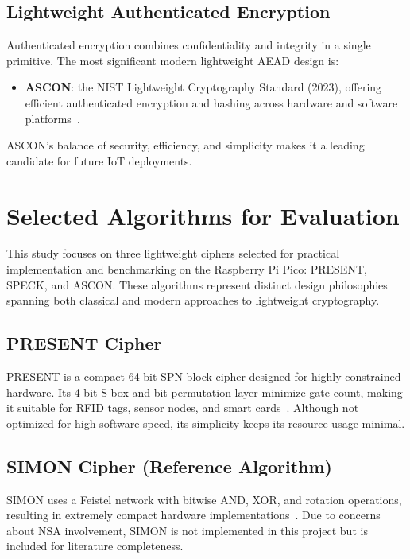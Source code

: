 \documentclass[12pt]{report}
\begin{document}
\subsection{Lightweight Authenticated Encryption}

Authenticated encryption combines confidentiality and integrity in a single primitive. The most significant modern lightweight AEAD design is:
\begin{itemize}
    \item \textbf{ASCON}: the NIST Lightweight Cryptography Standard (2023), offering efficient authenticated encryption and hashing across hardware and software platforms~\cite{dobraunig2016ascon,nist2023lwc}.
\end{itemize}

ASCON's balance of security, efficiency, and simplicity makes it a leading candidate for future IoT deployments.

\section{Selected Algorithms for Evaluation}

This study focuses on three lightweight ciphers selected for practical implementation and
benchmarking on the Raspberry Pi Pico: PRESENT, SPECK, and ASCON. These algorithms represent
distinct design philosophies spanning both classical and modern approaches to lightweight cryptography.

\subsection{PRESENT Cipher}

PRESENT is a compact 64-bit SPN block cipher designed for highly constrained hardware. Its 4-bit
S-box and bit-permutation layer minimize gate count, making it suitable for RFID tags, sensor nodes,
and smart cards~\cite{bogdanov2007present}. Although not optimized for high software speed, its
simplicity keeps its resource usage minimal.

\subsection{SIMON Cipher (Reference Algorithm)}

SIMON uses a Feistel network with bitwise AND, XOR, and rotation operations, resulting in extremely
compact hardware implementations~\cite{beaulieu2015simon}. Due to concerns about NSA involvement,
SIMON is not implemented in this project but is included for literature completeness.
\end{document}
